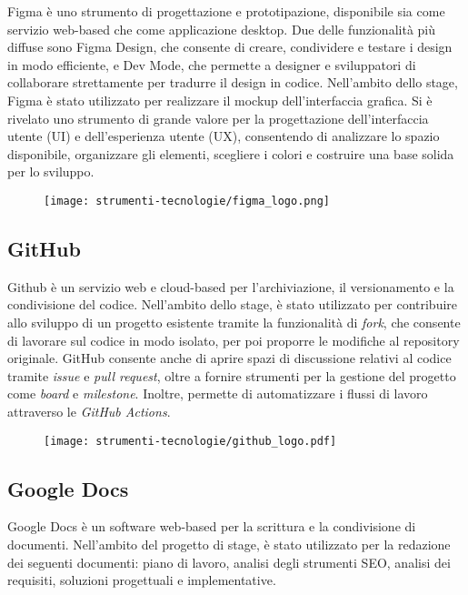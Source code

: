\par Figma è uno strumento di progettazione e prototipazione, disponibile sia come servizio web-based che come applicazione desktop. Due delle funzionalità più diffuse sono Figma Design, che consente di creare, condividere e testare i design in modo efficiente, e Dev Mode, che permette a designer e sviluppatori di collaborare strettamente per tradurre il design in codice. Nell’ambito dello stage, Figma è stato utilizzato per realizzare il mockup dell’interfaccia grafica. Si è rivelato uno strumento di grande valore per la progettazione dell'interfaccia utente (UI) e dell’esperienza utente (UX), consentendo di analizzare lo spazio disponibile, organizzare gli elementi, scegliere i colori e costruire una base solida per lo sviluppo.

\begin{figure}[H]
    \centering 
    \texttt{[image: strumenti-tecnologie/figma\_logo.png]} 
\end{figure}

\subsection*{GitHub}

\par Github è un servizio web e cloud-based per l'archiviazione, il versionamento e la condivisione del codice. Nell’ambito dello stage, è stato utilizzato per contribuire allo sviluppo di un progetto esistente tramite la funzionalità di \textit{fork}, che consente di lavorare sul codice in modo isolato, per poi proporre le modifiche al repository originale. GitHub consente anche di aprire spazi di discussione relativi al codice tramite \textit{issue} e \textit{pull request}, oltre a fornire strumenti per la gestione del progetto come \textit{board} e \textit{milestone}. Inoltre, permette di automatizzare i flussi di lavoro attraverso le \textit{GitHub Actions}.

\begin{figure}[H]
    \centering 
    \texttt{[image: strumenti-tecnologie/github\_logo.pdf]} 
\end{figure}

\subsection*{Google Docs}

\par Google Docs è un software web-based per la scrittura e la condivisione di documenti. Nell’ambito del progetto di stage, è stato utilizzato per la redazione dei seguenti documenti: piano di lavoro, analisi degli strumenti SEO, analisi dei requisiti, soluzioni progettuali e implementative.

